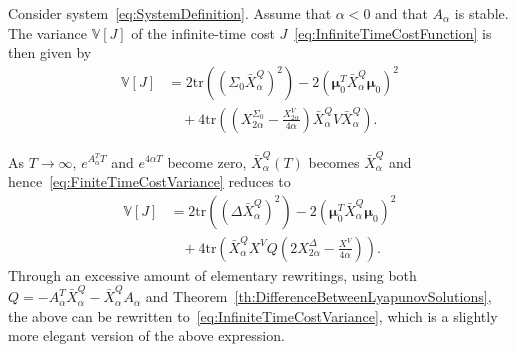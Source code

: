 \documentclass[twocolumn]{autart}
\newcommand{\ve}[1]{{\boldsymbol{#1}}} \newcommand{\tr}{\mbox{tr}} \newcommand{\ex}{\mathds{E}} \newcommand{\va}{\mathds{V}}
\begin{document}
\begin{thm}\label{th:InfiniteTimeCostVariance}
Consider system~\eqref{eq:SystemDefinition}. Assume that $\alpha < 0$ and that $A_\alpha$ is stable. The variance $\va[J]$ of the infinite-time cost $J$~\eqref{eq:InfiniteTimeCostFunction} is then given by
\begin{align}
\va[J] & = 2\tr\left((\Sigma_0 \bar{X}_\alpha^Q)^2\right) - 2\left(\ve{\mu}_0^T \bar{X}_\alpha^Q \ve{\mu}_0\right)^2 \nonumber \\
& \hspace{12pt} + 4\tr\left(\left(X_{2\alpha}^{\Sigma_0} - \frac{X_{2\alpha}^V}{4\alpha}\right) \bar{X}_\alpha^Q V \bar{X}_\alpha^Q\right). \label{eq:InfiniteTimeCostVariance}
\end{align}
\end{thm}
\begin{pf}
As $T \rightarrow \infty$, $e^{A_\alpha^T T}$ and $e^{4\alpha T}$ become zero, $\bar{X}_\alpha^Q(T)$ becomes $\bar{X}_\alpha^Q$ and hence~\eqref{eq:FiniteTimeCostVariance} reduces to
\begin{align}
\va[J] & = 2\tr\left((\Delta \bar{X}_\alpha^Q)^2\right) - 2\left(\ve{\mu}_0^T \bar{X}_\alpha^Q \ve{\mu}_0\right)^2 \label{eq:InfiniteTimeCostVarianceReduction} \\
& \hspace{10pt} + 4\tr\left(\bar{X}_\alpha^Q X^V Q \left(2X_{2\alpha}^\Delta - \frac{X^V}{4\alpha}\right)\right). \nonumber
\end{align}
Through an excessive amount of elementary rewritings, using both $Q = -A_\alpha^T \bar{X}_\alpha^Q - \bar{X}_\alpha^Q A_\alpha$ and Theorem~\ref{th:DifferenceBetweenLyapunovSolutions}, the above can be rewritten to~\eqref{eq:InfiniteTimeCostVariance}, which is a slightly more elegant version of the above expression.
\end{pf}
\end{document}
